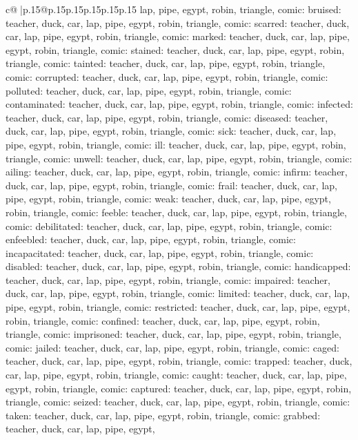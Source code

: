 \documentclass{article}
\begin{document}
{\begin{supertabular}{c@{$\;$}|p{.15\linewidth}@{}p{.15\linewidth}p{.15\linewidth}p{.15\linewidth}p{.15\linewidth}p{.15\linewidth}}
{{{lap, pipe, egypt, robin, triangle, comic\n\nCLUE: bruised\nTARGETS: teacher, duck, car, lap, pipe, egypt, robin, triangle, comic\n\nCLUE: scarred\nTARGETS: teacher, duck, car, lap, pipe, egypt, robin, triangle, comic\n\nCLUE: marked\nTARGETS: teacher, duck, car, lap, pipe, egypt, robin, triangle, comic\n\nCLUE: stained\nTARGETS: teacher, duck, car, lap, pipe, egypt, robin, triangle, comic\n\nCLUE: tainted\nTARGETS: teacher, duck, car, lap, pipe, egypt, robin, triangle, comic\n\nCLUE: corrupted\nTARGETS: teacher, duck, car, lap, pipe, egypt, robin, triangle, comic\n\nCLUE: polluted\nTARGETS: teacher, duck, car, lap, pipe, egypt, robin, triangle, comic\n\nCLUE: contaminated\nTARGETS: teacher, duck, car, lap, pipe, egypt, robin, triangle, comic\n\nCLUE: infected\nTARGETS: teacher, duck, car, lap, pipe, egypt, robin, triangle, comic\n\nCLUE: diseased\nTARGETS: teacher, duck, car, lap, pipe, egypt, robin, triangle, comic\n\nCLUE: sick\nTARGETS: teacher, duck, car, lap, pipe, egypt, robin, triangle, comic\n\nCLUE: ill\nTARGETS: teacher, duck, car, lap, pipe, egypt, robin, triangle, comic\n\nCLUE: unwell\nTARGETS: teacher, duck, car, lap, pipe, egypt, robin, triangle, comic\n\nCLUE: ailing\nTARGETS: teacher, duck, car, lap, pipe, egypt, robin, triangle, comic\n\nCLUE: infirm\nTARGETS: teacher, duck, car, lap, pipe, egypt, robin, triangle, comic\n\nCLUE: frail\nTARGETS: teacher, duck, car, lap, pipe, egypt, robin, triangle, comic\n\nCLUE: weak\nTARGETS: teacher, duck, car, lap, pipe, egypt, robin, triangle, comic\n\nCLUE: feeble\nTARGETS: teacher, duck, car, lap, pipe, egypt, robin, triangle, comic\n\nCLUE: debilitated\nTARGETS: teacher, duck, car, lap, pipe, egypt, robin, triangle, comic\n\nCLUE: enfeebled\nTARGETS: teacher, duck, car, lap, pipe, egypt, robin, triangle, comic\n\nCLUE: incapacitated\nTARGETS: teacher, duck, car, lap, pipe, egypt, robin, triangle, comic\n\nCLUE: disabled\nTARGETS: teacher, duck, car, lap, pipe, egypt, robin, triangle, comic\n\nCLUE: handicapped\nTARGETS: teacher, duck, car, lap, pipe, egypt, robin, triangle, comic\n\nCLUE: impaired\nTARGETS: teacher, duck, car, lap, pipe, egypt, robin, triangle, comic\n\nCLUE: limited\nTARGETS: teacher, duck, car, lap, pipe, egypt, robin, triangle, comic\n\nCLUE: restricted\nTARGETS: teacher, duck, car, lap, pipe, egypt, robin, triangle, comic\n\nCLUE: confined\nTARGETS: teacher, duck, car, lap, pipe, egypt, robin, triangle, comic\n\nCLUE: imprisoned\nTARGETS: teacher, duck, car, lap, pipe, egypt, robin, triangle, comic\n\nCLUE: jailed\nTARGETS: teacher, duck, car, lap, pipe, egypt, robin, triangle, comic\n\nCLUE: caged\nTARGETS: teacher, duck, car, lap, pipe, egypt, robin, triangle, comic\n\nCLUE: trapped\nTARGETS: teacher, duck, car, lap, pipe, egypt, robin, triangle, comic\n\nCLUE: caught\nTARGETS: teacher, duck, car, lap, pipe, egypt, robin, triangle, comic\n\nCLUE: captured\nTARGETS: teacher, duck, car, lap, pipe, egypt, robin, triangle, comic\n\nCLUE: seized\nTARGETS: teacher, duck, car, lap, pipe, egypt, robin, triangle, comic\n\nCLUE: taken\nTARGETS: teacher, duck, car, lap, pipe, egypt, robin, triangle, comic\n\nCLUE: grabbed\nTARGETS: teacher, duck, car, lap, pipe, egypt, }}}
\end{supertabular}}
\end{document}
